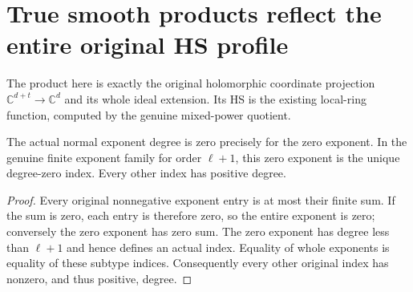 \section{True smooth products reflect the entire original HS profile}

The product here is exactly the original holomorphic coordinate projection
$\mathbb C^{d+t}\to\mathbb C^d$ and its whole ideal extension. Its HS is the
existing local-ring function, computed by the genuine mixed-power quotient.

\begin{lemma}
\label{hir:actual-product-unique-degree-zero-monomial}
\leanok
The actual normal exponent degree is zero precisely for the zero exponent.
In the genuine finite exponent family for order $\ell+1$, this zero exponent
is the unique degree-zero index. Every other index has positive degree.
\end{lemma}
\begin{proof}
Every original nonnegative exponent entry is at most their finite sum.
If the sum is zero, each entry is therefore zero, so the entire exponent
is zero; conversely the zero exponent has zero sum. The zero exponent has
degree less than $\ell+1$ and hence defines an actual index. Equality of
whole exponents is equality of these subtype indices. Consequently every
other original index has nonzero, and thus positive, degree.
\end{proof}

